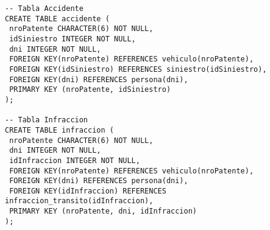 \begin{verbatim}
-- Tabla Accidente
CREATE TABLE accidente (
 nroPatente CHARACTER(6) NOT NULL,
 idSiniestro INTEGER NOT NULL,
 dni INTEGER NOT NULL,
 FOREIGN KEY(nroPatente) REFERENCES vehiculo(nroPatente),
 FOREIGN KEY(idSiniestro) REFERENCES siniestro(idSiniestro),
 FOREIGN KEY(dni) REFERENCES persona(dni), 
 PRIMARY KEY (nroPatente, idSiniestro)
);

-- Tabla Infraccion
CREATE TABLE infraccion (
 nroPatente CHARACTER(6) NOT NULL,
 dni INTEGER NOT NULL,
 idInfraccion INTEGER NOT NULL,
 FOREIGN KEY(nroPatente) REFERENCES vehiculo(nroPatente),
 FOREIGN KEY(dni) REFERENCES persona(dni), 
 FOREIGN KEY(idInfraccion) REFERENCES infraccion_transito(idInfraccion), 
 PRIMARY KEY (nroPatente, dni, idInfraccion)
);


\end{verbatim}
